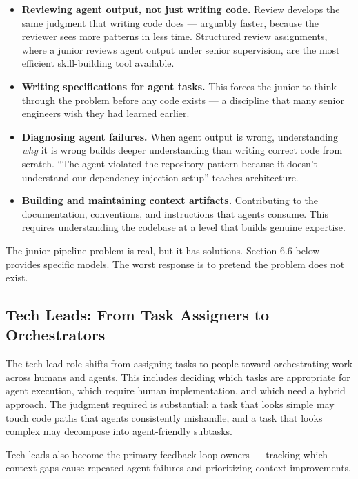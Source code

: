 \documentclass[
  a4paper,
  DIV=11,
  numbers=noendperiod]{scrreprt}
\providecommand{\tightlist}{%
  \setlength{\itemsep}{0pt}\setlength{\parskip}{0pt}}
\begin{document}
\begin{itemize}
\tightlist
\item
  \textbf{Reviewing agent output, not just writing code.} Review
  develops the same judgment that writing code does --- arguably faster,
  because the reviewer sees more patterns in less time. Structured
  review assignments, where a junior reviews agent output under senior
  supervision, are the most efficient skill-building tool available.
\item
  \textbf{Writing specifications for agent tasks.} This forces the
  junior to think through the problem before any code exists --- a
  discipline that many senior engineers wish they had learned earlier.
\item
  \textbf{Diagnosing agent failures.} When agent output is wrong,
  understanding \emph{why} it is wrong builds deeper understanding than
  writing correct code from scratch. ``The agent violated the repository
  pattern because it doesn't understand our dependency injection setup''
  teaches architecture.
\item
  \textbf{Building and maintaining context artifacts.} Contributing to
  the documentation, conventions, and instructions that agents consume.
  This requires understanding the codebase at a level that builds
  genuine expertise.
\end{itemize}

The junior pipeline problem is real, but it has solutions. Section 6.6
below provides specific models. The worst response is to pretend the
problem does not exist.

\subsection{Tech Leads: From Task Assigners to
Orchestrators}\label{tech-leads-from-task-assigners-to-orchestrators}

The tech lead role shifts from assigning tasks to people toward
orchestrating work across humans and agents. This includes deciding
which tasks are appropriate for agent execution, which require human
implementation, and which need a hybrid approach. The judgment required
is substantial: a task that looks simple may touch code paths that
agents consistently mishandle, and a task that looks complex may
decompose into agent-friendly subtasks.

Tech leads also become the primary feedback loop owners --- tracking
which context gaps cause repeated agent failures and prioritizing
context improvements.
\end{document}
